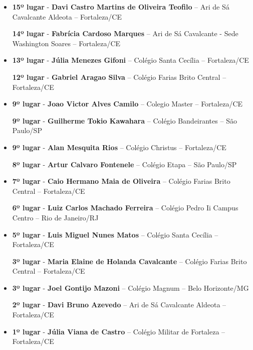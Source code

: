 \documentclass{article}
\begin{document}
\begin{itemize}
\item
\textbf{15º lugar} - \textbf{Davi Castro Martins de Oliveira Teofilo} – Ari de Sá Cavalcante Aldeota – Fortaleza/CE


\textbf{14º lugar} - \textbf{Fabrícia Cardoso Marques} – Ari de Sá Cavalcante - Sede Washington Soares – Fortaleza/CE



\item
\textbf{13º lugar} - \textbf{Júlia Menezes Gifoni} – Colégio Santa Cecília – Fortaleza/CE


\textbf{12º lugar} - \textbf{Gabriel Aragao Silva} – Colégio Farias Brito Central – Fortaleza/CE



\item
\textbf{9º lugar} - \textbf{Joao Victor Alves Camilo} – Colegio Master – Fortaleza/CE


\textbf{9º lugar} - \textbf{Guilherme Tokio Kawahara} – Colégio Bandeirantes – São Paulo/SP



\item
\textbf{9º lugar} - \textbf{Alan Mesquita Rios} – Colégio Christus – Fortaleza/CE


\textbf{8º lugar} - \textbf{Artur Calvaro Fontenele} – Colégio Etapa – São Paulo/SP



\item
\textbf{7º lugar} - \textbf{Caio Hermano Maia de Oliveira} – Colégio Farias Brito Central – Fortaleza/CE


\textbf{6º lugar} - \textbf{Luiz Carlos Machado Ferreira} – Colégio Pedro Ii Campus Centro – Rio de Janeiro/RJ



\item
\textbf{5º lugar} - \textbf{Luis Miguel Nunes Matos} – Colégio Santa Cecília – Fortaleza/CE


\textbf{3º lugar} - \textbf{Maria Elaine de Holanda Cavalcante} – Colégio Farias Brito Central – Fortaleza/CE



\item
\textbf{3º lugar} - \textbf{Joel Gontijo Mazoni} – Colégio Magnum – Belo Horizonte/MG


\textbf{2º lugar} - \textbf{Davi Bruno Azevedo} – Ari de Sá Cavalcante Aldeota – Fortaleza/CE



\item
\textbf{1º lugar} - \textbf{Júlia Viana de Castro} – Colégio Militar de Fortaleza – Fortaleza/CE



\end{itemize}
\end{document}
